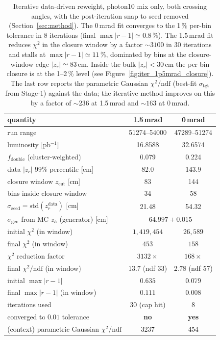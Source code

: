 \documentclass[11pt,a4paper]{article}
\begin{document}
\begin{table}[H]
\centering
\renewcommand{\arraystretch}{1.15}
\begin{tabular}{l c c}
\toprule
quantity & 1.5\,mrad & 0\,mrad \\
\midrule
run range                                & 51274--54000 & 47289--51274 \\
luminosity [pb$^{-1}$]                   & 16.8588      & 32.6574      \\
$f_\mathrm{double}$ (cluster-weighted)   & 0.079        & 0.224        \\
data $|z_r|$ 99\% percentile [cm]        & 82.0         & 143.9        \\
closure window $z_\mathrm{cut}$ [cm]     & 83           & 144          \\
bins inside closure window               & 34           & 58           \\
$\sigma_\mathrm{seed}=\mathrm{std}(z_r^\mathrm{data})$ [cm]  & 21.48 & 54.32 \\
$\sigma_\mathrm{gen}$ from MC $z_h$ (generator) [cm] & \multicolumn{2}{c}{$64.997 \pm 0.015$} \\
\midrule
initial $\chi^2$ (in window)             & $1{,}419{,}454$ & $26{,}589$ \\
final   $\chi^2$ (in window)             & $453$           & $158$ \\
$\chi^2$ reduction factor                & $3132\times$    & $168\times$ \\
final $\chi^2/\mathrm{ndf}$ (in window)  & $13.7$ (ndf 33) & $2.78$ (ndf 57) \\
initial $\max|r-1|$                      & $0.635$         & $0.079$ \\
final   $\max|r-1|$ (in window)          & $0.111$         & $0.008$ \\
iterations used                          & 30 (cap hit)    & 8 \\
converged to $0.01$ tolerance            & \textbf{no}     & \textbf{yes} \\
\midrule
(context) parametric Gaussian $\chi^2/\mathrm{ndf}$ & 3237       & 454 \\
\bottomrule
\end{tabular}
\caption{Iterative data-driven reweight, photon10 mix only, both
crossing angles, with the post-iteration snap to seed removed
(Section~\ref{sec:method}). The 0\,mrad fit converges to the
1\,\% per-bin tolerance in 8 iterations (final
$\max|r\!-\!1|\!\simeq\!0.8\,\%$). The 1.5\,mrad fit reduces $\chi^2$
in the closure window by a factor $\sim\!3100$ in 30 iterations and
stalls at $\max|r\!-\!1|\!\simeq\!11\,\%$, dominated by bins at the
closure-window edge $|z_r|\!\simeq\!83$\,cm. Inside the bulk
$|z_r|\!<\!30$\,cm the per-bin closure is at the 1--2\,\% level
(see Figure~\ref{fig:iter_1p5mrad_closure}). The last row reports the
parametric Gaussian $\chi^2/\mathrm{ndf}$ (best-fit
$\sigma_\mathrm{tgt}$ from Stage-1) against the data; the iterative
method improves on this by a factor of $\sim\!236$ at 1.5\,mrad and
$\sim\!163$ at 0\,mrad.}
\label{tab:iter_summary}
\end{table}
\end{document}
